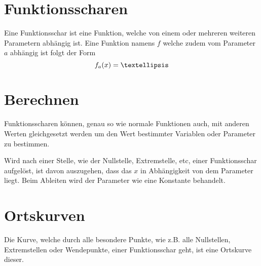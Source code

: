 \documentclass{article}
\begin{document}
 
\section{Funktionsscharen}
 
\begin{minipage}[t]{\dimexpr\textwidth-5cm}
 Eine Funktionsschar ist eine Funktion, welche von einem oder mehreren weiteren Parametern abhängig ist. Eine Funktion namens $f$ welche zudem vom Parameter $a$ abhängig ist folgt der Form
 \[
  f_a(x) = \textellipsis
 \]
 
 \section{Berechnen}
 Funktionsscharen können, genau so wie normale Funktionen auch, mit anderen Werten gleichgesetzt werden um den Wert bestimmter Variablen oder Parameter zu bestimmen.
\vspace{0.4em}
 
\end{minipage}
\hfill
\begin{minipage}[t]{5cm}
  \centering
\end{minipage}
Wird nach einer Stelle, wie der Nullstelle, Extremstelle, etc, einer Funktionsschar aufgelöst, ist davon auszugehen, dass das $x$ in Abhängigkeit von dem Parameter liegt.   
Beim Ableiten wird der Parameter wie eine Konstante behandelt. 
 
\section{Ortskurven}
Die Kurve, welche durch alle besondere Punkte, wie z.B. alle Nullstellen, Extremstellen oder Wendepunkte, einer Funktionsschar geht, ist eine Ortskurve dieser.
 
\end{document}
